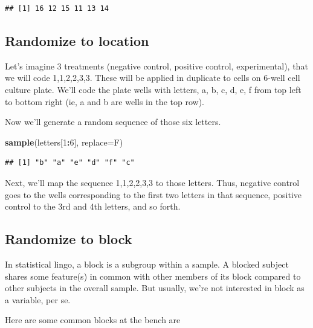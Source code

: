 \documentclass[]{book}
\newenvironment{Shaded}{\begin{snugshade}}{\end{snugshade}}
\newcommand{\DataTypeTok}[1]{\textcolor[rgb]{0.13,0.29,0.53}{#1}}
\newcommand{\DecValTok}[1]{\textcolor[rgb]{0.00,0.00,0.81}{#1}}
\newcommand{\KeywordTok}[1]{\textcolor[rgb]{0.13,0.29,0.53}{\textbf{#1}}}
\newcommand{\NormalTok}[1]{#1}
\newcommand{\OperatorTok}[1]{\textcolor[rgb]{0.81,0.36,0.00}{\textbf{#1}}}
\begin{document}
\begin{verbatim}
## [1] 16 12 15 11 13 14
\end{verbatim}

\hypertarget{randomize-to-location}{%
\subsection{Randomize to location}\label{randomize-to-location}}

Let's imagine 3 treatments (negative control, positive control, experimental), that we will code 1,1,2,2,3,3. These will be applied in duplicate to cells on 6-well cell culture plate. We'll code the plate wells with letters, a, b, c, d, e, f from top left to bottom right (ie, a and b are wells in the top row).

Now we'll generate a random sequence of those six letters.

\begin{Shaded}
\begin{Highlighting}[]
\KeywordTok{sample}\NormalTok{(letters[}\DecValTok{1}\OperatorTok{:}\DecValTok{6}\NormalTok{], }\DataTypeTok{replace=}\NormalTok{F)}
\end{Highlighting}
\end{Shaded}

\begin{verbatim}
## [1] "b" "a" "e" "d" "f" "c"
\end{verbatim}

Next, we'll map the sequence 1,1,2,2,3,3 to those letters. Thus, negative control goes to the wells corresponding to the first two letters in that sequence, positive control to the 3rd and 4th letters, and so forth.

\hypertarget{randomize-to-block}{%
\subsection{Randomize to block}\label{randomize-to-block}}

In statistical lingo, a block is a subgroup within a sample. A blocked subject shares some feature(s) in common with other members of its block compared to other subjects in the overall sample. But usually, we're not interested in block as a variable, per se.

Here are some common blocks at the bench are
\end{document}
